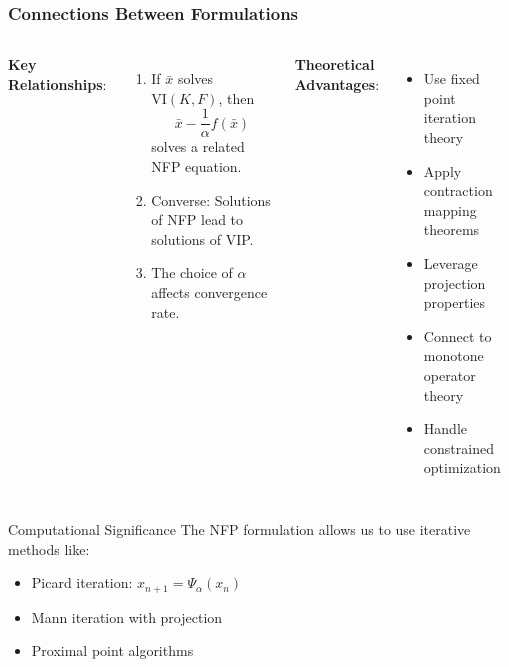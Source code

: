 \documentclass[aspectratio=169,10pt]{beamer}
\begin{document}
\begin{frame}
\frametitle{Connections Between Formulations}

\vspace{0.2cm}

\begin{columns}[T]

\textbf{Key Relationships}:

\begin{enumerate}
    \item If $\bar{x}$ solves $\text{VI}(K, F)$, then
    \[\bar{x} - \frac{1}{\alpha}f(\bar{x})\]
    solves a related NFP equation.

    \item Converse: Solutions of NFP lead to solutions of VIP.

    \item The choice of $\alpha$ affects convergence rate.
\end{enumerate}


\textbf{Theoretical Advantages}:

\begin{itemize}
    \item Use fixed point iteration theory
    \item Apply contraction mapping theorems
    \item Leverage projection properties
    \item Connect to monotone operator theory
    \item Handle constrained optimization
\end{itemize}

\end{columns}

\vspace{0.3cm}

\begin{block}{Computational Significance}
The NFP formulation allows us to use iterative methods like:
\begin{itemize}
    \item Picard iteration: $x_{n+1} = \Psi_\alpha(x_n)$
    \item Mann iteration with projection
    \item Proximal point algorithms
\end{itemize}
\end{block}

\end{frame}
\end{document}
